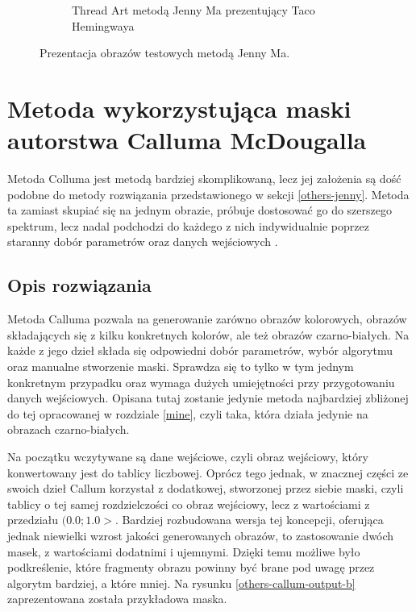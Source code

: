 \begin{figure}[H]
\begin{subfigure}{0.24\textwidth}
            \caption{Thread Art metodą Jenny Ma prezentujący Taco Hemingwaya}
            \label{others-jenny-output-d}
        \end{subfigure}
        \caption{Prezentacja obrazów testowych metodą Jenny Ma.}
        \label{others-jenny-output}
        \end{figure}
            
    \section{Metoda wykorzystująca maski autorstwa Calluma McDougalla} \label{others-callum}
    Metoda Colluma jest metodą bardziej skomplikowaną, lecz jej założenia są dość podobne do metody rozwiązania przedstawionego w sekcji \ref{others-jenny}. Metoda ta zamiast skupiać się na jednym obrazie, próbuje dostosować go do szerszego spektrum, lecz nadal podchodzi do każdego z nich indywidualnie poprzez staranny dobór parametrów oraz danych wejściowych \cite{callum-github}.
        \subsection{Opis rozwiązania}
        Metoda Calluma pozwala na generowanie zarówno obrazów kolorowych, obrazów składających się z kilku konkretnych kolorów, ale też obrazów czarno-białych. Na każde z jego dzieł składa się odpowiedni dobór parametrów, wybór algorytmu oraz manualne stworzenie maski. Sprawdza się to tylko w tym jednym konkretnym przypadku oraz wymaga dużych umiejętności przy przygotowaniu danych wejściowych. Opisana tutaj zostanie jedynie metoda najbardziej zbliżonej do tej opracowanej w rozdziale \ref{mine}, czyli taka, która działa jedynie na obrazach czarno-białych.
        
        Na początku wczytywane są dane wejściowe, czyli obraz wejściowy, który konwertowany jest do tablicy liczbowej. Oprócz tego jednak, w znacznej części ze swoich dzieł Callum korzystał z dodatkowej, stworzonej przez siebie maski, czyli tablicy o tej samej rozdzielczości co obraz wejściowy, lecz z wartościami z przedziału \((0.0;1.0>\). Bardziej rozbudowana wersja tej koncepcji, oferująca jednak niewielki wzrost jakości generowanych obrazów, to zastosowanie dwóch masek, z wartościami dodatnimi i ujemnymi. Dzięki temu możliwe było podkreślenie, które fragmenty obrazu powinny być brane pod uwagę przez algorytm bardziej, a które mniej. Na rysunku \ref{others-callum-output-b} zaprezentowana została przykładowa maska.
        
